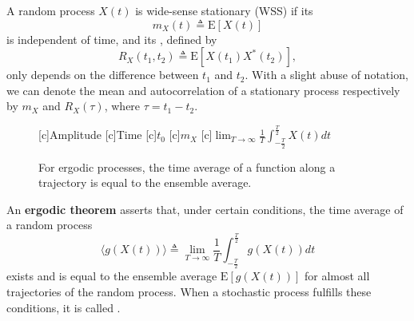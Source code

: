 \begin{definition}[Stationarity]
A random process $X(t)$ is wide-sense stationary (WSS) if its 
\begin{equation*}
m_X(t) \triangleq \mathrm{E} [X(t)]
\end{equation*}
is independent of time, and its , defined by
\begin{equation*}
R_X(t_1, t_2) \triangleq \mathrm{E} [X(t_1) X^*(t_2)],
\end{equation*}
only depends on the difference between $t_1$ and $t_2$.
With a slight abuse of notation, we can denote the mean and autocorrelation of a stationary process respectively by $m_X$ and $R_X(\tau)$, where $\tau = t_1 - t_2$.
\end{definition}

\begin{figure}[htbp]
\begin{center}
\begin{psfrags}
[c]{Amplitude}
[c]{Time}
[c]{$t_0$}
[c]{$m_X$}
[c]{$\lim_{T \rightarrow \infty} \frac{1}{T} \int_{- \frac{T}{2}}^{\frac{T}{2}} X(t) dt$}
\end{psfrags}
\caption{For ergodic processes, the time average of a function along a trajectory is equal to the ensemble average.}
\label{figure:ErgodicProcess}
\end{center}
\end{figure}

\begin{definition}[Ergodic]
An \textbf{ergodic theorem} asserts that, under certain conditions, the time average of a random process
\begin{equation*}
\langle g(X(t)) \rangle \triangleq \lim_{T \rightarrow \infty} \frac{1}{T} \int_{- \frac{T}{2}}^{\frac{T}{2}} g(X(t)) dt
\end{equation*}
exists and is equal to the ensemble average $\mathrm{E}[g(X(t))]$ for almost all trajectories of the random process.
When a stochastic process fulfills these conditions, it is called .
\end{definition}

